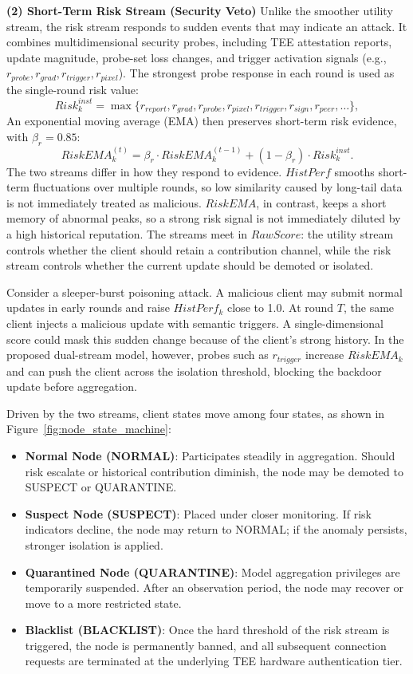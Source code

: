 \documentclass[final,5p,times,twocolumn]{elsarticle/elsarticle}
\newenvironment{tightitemize}{%
  \begin{itemize}\setlength{\itemsep}{1pt}\setlength{\parskip}{0pt}\setlength{\parsep}{0pt}}{\end{itemize}}
\begin{document}
\textbf{(2) Short-Term Risk Stream (Security Veto)}
Unlike the smoother utility stream, the risk stream responds to sudden events that may indicate an attack. It combines multidimensional security probes, including TEE attestation reports, update magnitude, probe-set loss changes, and trigger activation signals (e.g., $r_{probe}, r_{grad}, r_{trigger}, r_{pixel}$). The strongest probe response in each round is used as the single-round risk value:
\begin{equation}
    Risk_{k}^{inst} = \max\{r_{report}, r_{grad}, r_{probe}, r_{pixel}, r_{trigger}, r_{sign}, r_{peer}, \dots \},
\end{equation}
An exponential moving average (EMA) then preserves short-term risk evidence, with $\beta_r = 0.85$:
\begin{equation}
    RiskEMA_{k}^{(t)} = \beta_{r} \cdot RiskEMA_{k}^{(t-1)} + (1 - \beta_{r}) \cdot Risk_{k}^{inst}.
\end{equation}
The two streams differ in how they respond to evidence. $HistPerf$ smooths short-term fluctuations over multiple rounds, so low similarity caused by long-tail data is not immediately treated as malicious. $RiskEMA$, in contrast, keeps a short memory of abnormal peaks, so a strong risk signal is not immediately diluted by a high historical reputation. The streams meet in $RawScore$: the utility stream controls whether the client should retain a contribution channel, while the risk stream controls whether the current update should be demoted or isolated.

Consider a sleeper-burst poisoning attack. A malicious client may submit normal updates in early rounds and raise $HistPerf_k$ close to 1.0. At round $T$, the same client injects a malicious update with semantic triggers. A single-dimensional score could mask this sudden change because of the client's strong history. In the proposed dual-stream model, however, probes such as $r_{trigger}$ increase $RiskEMA_k$ and can push the client across the isolation threshold, blocking the backdoor update before aggregation.

Driven by the two streams, client states move among four states, as shown in Figure~\ref{fig:node_state_machine}:
\begin{tightitemize}
    \item \textbf{Normal Node (NORMAL)}: Participates steadily in aggregation. Should risk escalate or historical contribution diminish, the node may be demoted to SUSPECT or QUARANTINE.
    \item \textbf{Suspect Node (SUSPECT)}: Placed under closer monitoring. If risk indicators decline, the node may return to NORMAL; if the anomaly persists, stronger isolation is applied.
    \item \textbf{Quarantined Node (QUARANTINE)}: Model aggregation privileges are temporarily suspended. After an observation period, the node may recover or move to a more restricted state.
    \item \textbf{Blacklist (BLACKLIST)}: Once the hard threshold of the risk stream is triggered, the node is permanently banned, and all subsequent connection requests are terminated at the underlying TEE hardware authentication tier.
\end{tightitemize}
\end{document}
